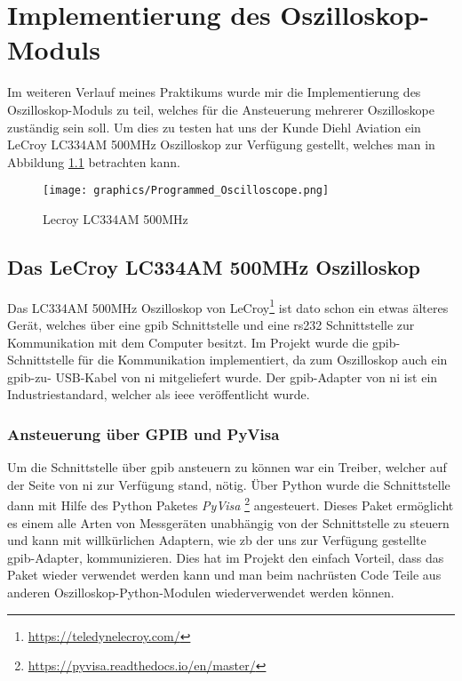 \chapter{Implementierung des Oszilloskop-Moduls}
\label{ch:osci}

Im weiteren Verlauf meines Praktikums wurde mir die Implementierung des Oszilloskop-Moduls zu 
teil, welches für die Ansteuerung mehrerer Oszilloskope zuständig sein soll. Um dies zu testen 
hat uns der Kunde Diehl Aviation ein LeCroy LC334AM 500MHz Oszilloskop zur Verfügung gestellt, 
welches man in Abbildung \ref{fig:lc334am} betrachten kann.  

\begin{figure}[H]
	\centering
	\texttt{[image: graphics/Programmed\_Oscilloscope.png]}
	\caption{Lecroy LC334AM 500MHz}
	\label{fig:lc334am}
\end{figure}

\section{Das LeCroy LC334AM 500MHz Oszilloskop}
\label{sec:lc334am}

Das LC334AM 500MHz Oszilloskop von LeCroy\footnote{\url{https://teledynelecroy.com/}} ist dato 
schon ein etwas älteres Gerät, welches über eine \ac{gpib} Schnittstelle und eine \ac{rs232} 
Schnittstelle zur Kommunikation mit dem Computer besitzt. Im Projekt wurde die \ac{gpib}-
Schnittstelle für die Kommunikation implementiert, da zum Oszilloskop auch ein \ac{gpib}-zu-
USB-Kabel von \ac{ni} mitgeliefert wurde. Der \ac{gpib}-Adapter von \ac{ni} ist ein 
Industriestandard, welcher als \ac{ieee} veröffentlicht wurde.

\subsection{Ansteuerung über GPIB und PyVisa}
\label{subsec:gpib}

Um die Schnittstelle über \ac{gpib} ansteuern zu können war ein Treiber, welcher auf der Seite 
von \ac{ni} zur Verfügung stand, nötig.
Über Python wurde die Schnittstelle dann mit Hilfe des Python Paketes \textit{PyVisa}
\footnote{\url{https://pyvisa.readthedocs.io/en/master/}} angesteuert. Dieses Paket ermöglicht 
es einem alle Arten von Messgeräten unabhängig von der Schnittstelle zu steuern und kann mit 
willkürlichen Adaptern, wie \ac{zb} der uns zur Verfügung gestellte \ac{gpib}-Adapter, 
kommunizieren. Dies hat im Projekt den einfach Vorteil, dass das Paket wieder verwendet werden 
kann und man beim nachrüsten Code Teile aus anderen Oszilloskop-Python-Modulen wiederverwendet 
werden können.

